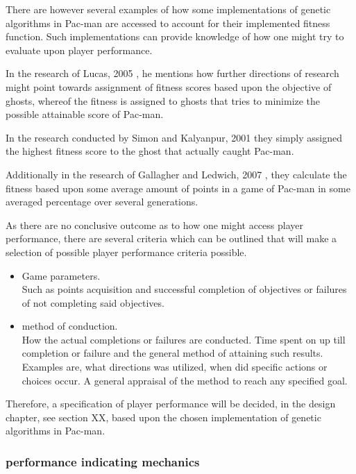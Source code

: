 There are however several examples of how some implementations of genetic algorithms in Pac-man are accessed to account for their implemented fitness function. Such implementations can provide knowledge of how one might try to evaluate upon player performance.

In the research of Lucas, 2005 \cite{Lucas2005}, he mentions how further directions of research might point towards assignment of fitness scores based upon the objective of ghosts, whereof the fitness is assigned to ghosts that tries to minimize the possible attainable score of Pac-man.

In the research conducted by Simon and Kalyanpur, 2001 \cite{Kalyanpur2001} they simply assigned the highest fitness score to the ghost that actually caught Pac-man.

Additionally in the research of Gallagher and Ledwich, 2007 \cite{Gallagher2007}, they calculate the fitness based upon some average amount of points in a game of Pac-man in some averaged percentage over several generations.

As there are no conclusive outcome as to how one might access player performance, there are several criteria which can be outlined that will make a selection of possible player performance criteria possible.

\begin{itemize}
\item Game parameters.\\
Such as points acquisition and successful completion of objectives or failures of not completing said objectives.
\item method of conduction.\\
How the actual completions or failures are conducted. Time spent on up till completion or failure and the general method of attaining such results. Examples are, what directions was utilized, when did specific actions or choices occur. A general appraisal of the method to reach any specified goal.
\end{itemize}

Therefore, a specification of player performance will be decided, in the design chapter, see section XX, based upon the chosen implementation of genetic algorithms in Pac-man.

\subsubsection{performance indicating mechanics}



